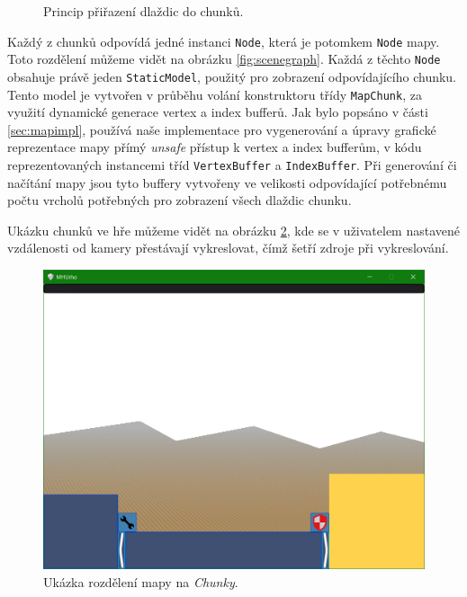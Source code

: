 \begin{figure}[h]
	\centering
	\fontsize{10pt}{12pt}\selectfont
	\def\svgwidth{0.7\textwidth}
	
	\caption{Princip přiřazení dlaždic do chunků.}
	\label{fig:mapdisplay}
\end{figure}

Každý z chunků odpovídá jedné instanci \texttt{Node}, která je potomkem \texttt{Node} mapy. Toto rozdělení můžeme vidět na obrázku \ref{fig:scenegraph}. Každá z těchto \texttt{Node} obsahuje právě jeden \texttt{StaticModel}, použitý pro zobrazení odpovídajícího chunku. Tento model je vytvořen v průběhu volání konstruktoru třídy \texttt{MapChunk}, za využití dynamické generace vertex a index bufferů. Jak bylo popsáno v části \ref{sec:mapimpl}, používá naše implementace pro vygenerování a úpravy grafické reprezentace mapy přímý \textit{unsafe} přístup k vertex a index bufferům, v kódu reprezentovaných instancemi tříd \texttt{VertexBuffer} a \texttt{IndexBuffer}.
Při generování či načítání mapy jsou tyto buffery vytvořeny ve velikosti odpovídající potřebnému počtu vrcholů potřebných pro zobrazení všech dlaždic chunku.


Ukázku chunků ve hře můžeme vidět na obrázku \ref{fig:chunks}, kde se v uživatelem nastavené vzdálenosti od kamery přestávají vykreslovat, čímž šetří zdroje při vykreslování.

\begin{figure}[h]
	\centering
	\includegraphics{img/chunks.png}
	\caption{Ukázka rozdělení mapy na \textit{Chunky}.}
	\label{fig:chunks}
\end{figure}

